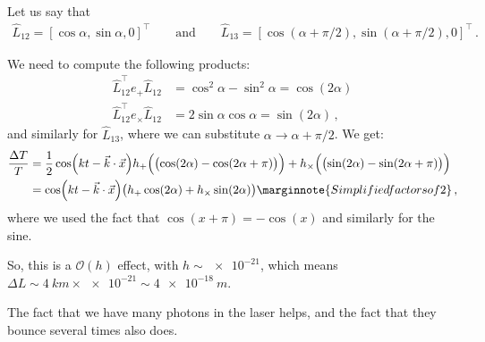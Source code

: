 \documentclass[main.tex]{subfiles}
\begin{document}
Let us say that 
%
\begin{align}
\hat{L}_{12} = [\cos \alpha , \sin \alpha , 0]^{\top} \qquad \text{and} \qquad \hat{L}_{13} = [\cos(\alpha + \pi /2), \sin(\alpha + \pi /2) , 0]^{\top}
\,.
\end{align}

We need to compute the following products: 
%
\begin{subequations}
\begin{align}
\hat{L}_{12}^{\top} e_{+} \hat{L}_{12} &= \cos^2\alpha - \sin^2\alpha = \cos(2 \alpha )
\\
\hat{L}_{12}^{\top} e_{ \times } \hat{L}_{12} &= 2 \sin \alpha \cos \alpha = \sin(2 \alpha )
\,,
\end{align}
\end{subequations}
%
and similarly for \(\hat{L}_{13} \), where we can substitute \(\alpha \rightarrow \alpha + \pi /2\). We get: 
%
\begin{subequations}
\begin{align}
\frac{\Delta T}{T} &= \frac{1}{2} \cos(kt - \vec{k} \cdot \vec{x}) 
h_{+}\qty(  \qty(\cos(2 \alpha ) - \cos(2 \alpha  + \pi ))) + 
h_{ \times } \qty(  \qty(\sin(2 \alpha ) - \sin(2 \alpha  + \pi )))  \\
&= \cos(kt - \vec{k} \cdot \vec{x}) \qty(
h_{+}\cos(2 \alpha ) + 
h_{\times} \sin(2 \alpha )) \marginnote{Simplified factors of 2}
\,,
\end{align}
\end{subequations}
%
where we used the fact that \(\cos(x + \pi ) = - \cos(x)\) and similarly for the sine.

So, this is a \(\mathcal{O}(h)\) effect, with \(h \sim \num{e-21}\), which means \(\Delta L  \sim \SI{4}{km} \times \num{e-21} \sim \SI{4e-18}{m}\). 

The fact that we have many photons in the laser helps, and the fact that they bounce several times also does. 
\end{document}
